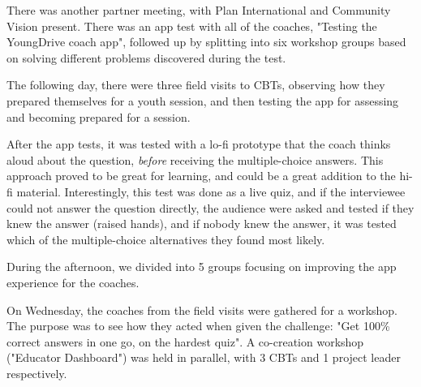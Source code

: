 There was another partner meeting, with Plan International and Community Vision present. There was an app test with all of the coaches, "Testing the YoungDrive coach app", followed up by splitting into six workshop groups based on solving different problems discovered during the test.

The following day, there were three field visits to CBTs, observing how they prepared themselves for a youth session, and then testing the app for assessing and becoming prepared for a session.

After the app tests, it was tested with a lo-fi prototype that the coach thinks aloud about the question, \textit{before} receiving the multiple-choice answers. This approach proved to be great for learning, and could be a great addition to the hi-fi material. Interestingly, this test was done as a live quiz, and if the interviewee could not answer the question directly, the audience were asked and tested if they knew the answer (raised hands), and if nobody knew the answer, it was tested which of the multiple-choice alternatives they found most likely.

During the afternoon, we divided into 5 groups focusing on improving the app experience for the coaches.

On Wednesday, the coaches from the field visits were gathered for a workshop. The purpose was to see how they acted when given the challenge: "Get 100\% correct answers in one go, on the hardest quiz". A co-creation workshop ("Educator Dashboard") was held in parallel, with 3 CBTs and 1 project leader respectively.

